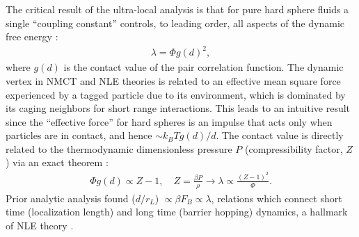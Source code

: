 \documentclass[twocolumn,showpacs,preprintnumbers,amsmath,amssymb,unsortedaddress,
]{revtex4-1}
\begin{document}
The critical result of the ultra-local analysis is that for pure hard sphere fluids a single “coupling constant” controls, to leading order, all aspects of the dynamic free energy \cite{45}:
\begin{eqnarray}
\lambda = \Phi g(d)^2,
\end{eqnarray}
where $g(d)$ is the contact value of the pair correlation function. The dynamic vertex in NMCT and NLE theories is related to an effective mean square force experienced by a tagged particle due to its environment, which is dominated by its caging neighbors for short range interactions. This leads to an intuitive result since the “effective force” for hard spheres is an impulse that acts only when particles are in contact, and hence $\sim k_BTg(d)/d$. The contact value is directly related to the thermodynamic dimensionless pressure $P$ (compressibility factor, $Z$) via an exact theorem \cite{7,35}:
\begin{eqnarray}
\Phi g(d) \varpropto Z-1, \quad Z = \frac{\beta P}{\rho}\rightarrow \lambda \varpropto \frac{(Z-1)^2}{\Phi}.
\end{eqnarray}
Prior analytic analysis found ($d/r_L$) $ \varpropto \beta F_B \varpropto \lambda$, relations which connect short time (localization length) and long time (barrier hopping) dynamics, a hallmark of NLE theory \cite{45}.
\end{document}
